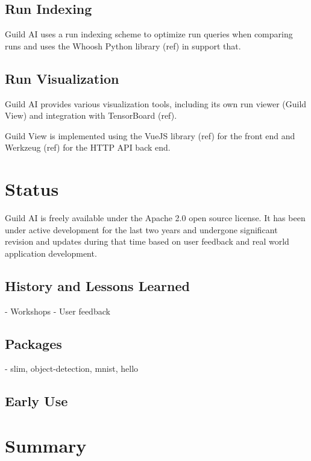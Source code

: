\documentclass{article}
\begin{document}
\subsection{Run Indexing}

Guild AI uses a run indexing scheme to optimize run queries when
comparing runs and uses the Whoosh Python library (ref) in support
that.

\subsection{Run Visualization}

Guild AI provides various visualization tools, including its own run
viewer (Guild View) and integration with TensorBoard (ref).

Guild View is implemented using the VueJS library (ref) for the front
end and Werkzeug (ref) for the HTTP API back end.

\section{Status}

Guild AI is freely available under the Apache 2.0 open source
license. It has been under active development for the last two years
and undergone significant revision and updates during that time based
on user feedback and real world application development.

\subsection{History and Lessons Learned}

- Workshops
- User feedback

\subsection{Packages}

- slim, object-detection, mnist, hello

\subsection{Early Use}

\section{Summary}



\end{document}
